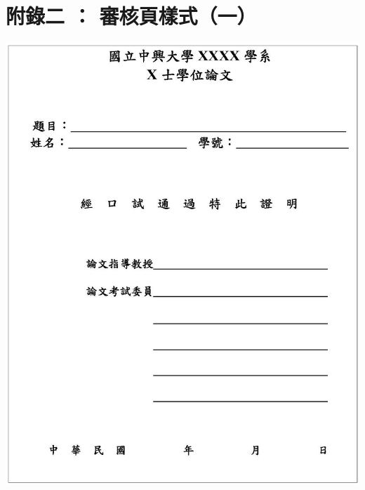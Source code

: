 \documentclass[12pt,oneside,openany,a4paper]{book}
\begin{document}
\chapter{附錄二 ： 審核頁樣式（一）}
    \begin{center}
        \includegraphics[bb=0 0 1225 1527,width=\textwidth]{examine1.jpg}
    \end{center}
\end{document}
